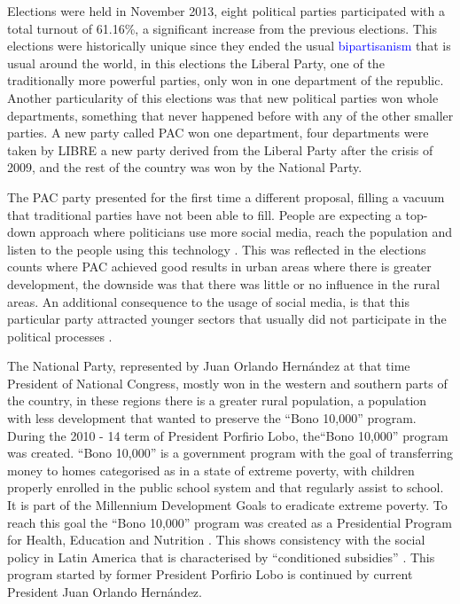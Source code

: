 \documentclass[letterpaper,10pt]{article}
\begin{document}
Elections were held in November 2013, eight political parties participated with a total turnout of 61.16\%, a significant increase from the previous elections. This elections were historically unique since they ended the usual \textcolor{blue}{bipartisanism} that is usual around the world, in this elections the Liberal Party, one of the traditionally more powerful parties, only won in one department of the republic. Another particularity of this elections was that new political parties won whole departments, something that never happened before with any of the other smaller parties. A new party called PAC won one department, four departments were taken by LIBRE a new party derived from the Liberal Party after the crisis of 2009, and the rest of the country was won by the National Party.

The PAC party presented for the first time a different proposal, filling a vacuum that traditional parties have not been able to fill. People are expecting a top-down approach where politicians use more social media, reach the population and listen to the people using this technology \citep{map2014}. This was reflected in the elections counts where PAC achieved good results in urban areas where there is greater development, the downside was that there was little or no influence in the rural areas. An additional consequence to the usage of social media, is that this particular party attracted younger sectors that usually did not participate in the political processes \citep{romero2014}.

The National Party, represented by Juan Orlando Hernández at that time President of National Congress, mostly won in the western and southern parts of the country, in these regions there is a greater rural population, a population with less development that wanted to preserve the ``Bono 10,000'' program. During the 2010 - 14 term of President Porfirio Lobo, the``Bono 10,000'' program was created. ``Bono 10,000'' is a government program with the goal of transferring money to homes categorised as in a state of extreme poverty, with children properly enrolled in the public school system and that regularly assist to school. It is part of the Millennium Development Goals \citep{mdg2006} to eradicate extreme poverty. To reach this goal the ``Bono 10,000'' program was created as a Presidential Program for Health, Education and Nutrition \citep{bono10k}. This shows consistency with the social policy in Latin America that is characterised by ``conditioned subsidies'' \citep{romero2014}. This program started by former President Porfirio Lobo is continued by current President Juan Orlando Hern\'{a}ndez. 
\end{document}
